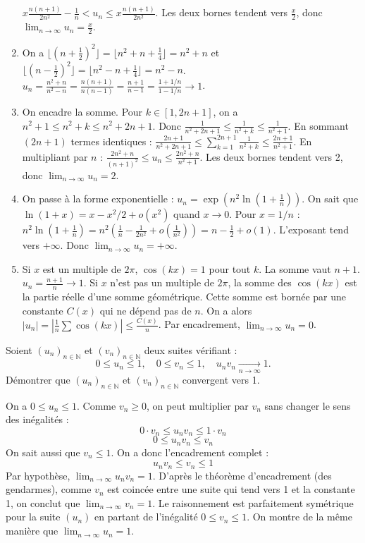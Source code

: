 \documentclass[solutions]{exercices}
\begin{document}
\begin{solution}
\begin{enumerate}
		      $x\frac{n(n+1)}{2n^2} - \frac{1}{n} < u_n \le x\frac{n(n+1)}{2n^2}$. Les deux bornes tendent vers $\frac{x}{2}$, donc $\lim_{n\to\infty} u_n = \frac{x}{2}$.
		\item On a $\lfloor(n+\frac12)^2\rfloor = \lfloor n^2+n+\frac14 \rfloor = n^2+n$ et $\lfloor(n-\frac12)^2\rfloor = \lfloor n^2-n+\frac14 \rfloor = n^2-n$.
		      $u_n = \frac{n^2+n}{n^2-n} = \frac{n(n+1)}{n(n-1)} = \frac{n+1}{n-1} = \frac{1+1/n}{1-1/n} \to 1$.
		\item On encadre la somme. Pour $k \in [1, 2n+1]$, on a $n^2+1 \le n^2+k \le n^2+2n+1$.
		      Donc $\frac{1}{n^2+2n+1} \le \frac{1}{n^2+k} \le \frac{1}{n^2+1}$.
		      En sommant $(2n+1)$ termes identiques : $\frac{2n+1}{n^2+2n+1} \le \sum_{k=1}^{2n+1} \frac{1}{n^2+k} \le \frac{2n+1}{n^2+1}$.
		      En multipliant par $n$ : $\frac{2n^2+n}{(n+1)^2} \le u_n \le \frac{2n^2+n}{n^2+1}$. Les deux bornes tendent vers 2, donc $\lim_{n\to\infty} u_n = 2$.
		\item On passe à la forme exponentielle : $u_n = \exp\left(n^2 \ln(1+\frac{1}{n})\right)$.
		      On sait que $\ln(1+x) = x - x^2/2 + o(x^2)$ quand $x \to 0$. Pour $x=1/n$ :
		      $n^2 \ln(1+\frac{1}{n}) = n^2(\frac{1}{n} - \frac{1}{2n^2} + o(\frac{1}{n^2})) = n - \frac{1}{2} + o(1)$.
		      L'exposant tend vers $+\infty$. Donc $\lim_{n\to\infty} u_n = +\infty$.
		\item Si $x$ est un multiple de $2\pi$, $\cos(kx)=1$ pour tout $k$. La somme vaut $n+1$. $u_n = \frac{n+1}{n} \to 1$.
		      Si $x$ n'est pas un multiple de $2\pi$, la somme des $\cos(kx)$ est la partie réelle d'une somme géométrique. Cette somme est bornée par une constante $C(x)$ qui ne dépend pas de $n$.
		      On a alors $|u_n| = |\frac{1}{n} \sum \cos(kx)| \le \frac{C(x)}{n}$. Par encadrement, $\lim_{n\to\infty} u_n = 0$.
	\end{enumerate}
\end{solution}

\begin{exercice}
	Soient $(u_n)_{n \in \mathbb{N}}$ et $(v_n)_{n \in \mathbb{N}}$ deux suites vérifiant :
	\[ 0 \le u_n \le 1, \quad 0 \le v_n \le 1, \quad u_n v_n \xrightarrow[n\to\infty]{} 1. \]
	Démontrer que $(u_n)_{n \in \mathbb{N}}$ et $(v_n)_{n \in \mathbb{N}}$ convergent vers 1.
\end{exercice}

\begin{solution}
	On a $0 \le u_n \le 1$. Comme $v_n \ge 0$, on peut multiplier par $v_n$ sans changer le sens des inégalités :
	\[ 0 \cdot v_n \le u_n v_n \le 1 \cdot v_n \]
	\[ 0 \le u_n v_n \le v_n \]
	On sait aussi que $v_n \le 1$. On a donc l'encadrement complet :
	\[ u_n v_n \le v_n \le 1 \]
	Par hypothèse, $\lim_{n\to\infty} u_n v_n = 1$.
	D'après le théorème d'encadrement (des gendarmes), comme $v_n$ est coincée entre une suite qui tend vers 1 et la constante 1, on conclut que $\lim_{n\to\infty} v_n = 1$.
	Le raisonnement est parfaitement symétrique pour la suite $(u_n)$ en partant de l'inégalité $0 \le v_n \le 1$. On montre de la même manière que $\lim_{n\to\infty} u_n = 1$.
\end{solution}
\end{document}
